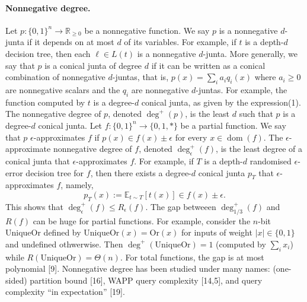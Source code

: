 \documentclass[10pt,a4paper]{article}
\begin{document}
\paragraph{Nonnegative degree.} Let $p:\{0,1\}^n\to\mathbb R_{\ge0}$ be a nonnegative function. We say $p$ is a nonnegative $d$-junta if it depends on at most $d$ of its variables. For example, if $t$ is a depth-$d$ decision tree, then each $\ell\in L(t)$ is a nonnegative $d$-junta. More generally, we say that $p$ is a conical junta of degree $d$ if it can be written as a conical combination of nonnegative $d$-juntas, that is, $p(x)=\sum_i a_iq_i(x)$ where $a_i\ge0$ are nonnegative scalars and the $q_i$ are nonnegative $d$-juntas. For example, the function computed by $t$ is a degree-$d$ conical junta, as given by the expression(1). The nonnegative degree of $p$, denoted $\deg^+(p)$, is the least $d$ such that $p$ is a degree-$d$ conical junta.
Let $f:\{0,1\}^n\to\{0,1,*\}$ be a partial function. We say that $p$ $\epsilon$-approximates $f$ if $p(x)\in f(x)\pm\epsilon$ for every $x\in\operatorname{dom}(f)$. The $\epsilon$-approximate nonnegative degree of $f$, denoted $\deg^+_\epsilon(f)$, is the least degree of a conical junta that $\epsilon$-approximates $f$. For example, if $T$ is a depth-$d$ randomised $\epsilon$-error decision tree for $f$, then there exists a degree-$d$ conical junta $p_T$ that $\epsilon$-approximates $f$, namely,
\[p_T(x):=\mathbb E_{t\sim T}[t(x)]\in f(x)\pm\epsilon.\]
This shows that $\deg^+_\epsilon(f)\le R_\epsilon(f)$. The gap betweeen $\deg^+_{1/3}(f)$ and $R(f)$ can be huge for partial functions. For example, consider the $n$-bit UniqueOr defined by $\mathrm{UniqueOr}(x)=\mathrm{Or}(x)$ for inputs of weight $|x|\in\{0,1\}$ and undefined othwerwise. Then $\deg^+(\mathrm{UniqueOr})=1$ (computed by $\sum_ix_i$) while $R(\mathrm{UniqueOr})=\Theta(n)$. For total functions, the gap is at most polynomial [9].
Nonnegative degree has been studied under many names: (one-sided) partition bound [16], WAPP query complexity [14,5], and query complexity ``in expectation'' [19].
\end{document}

